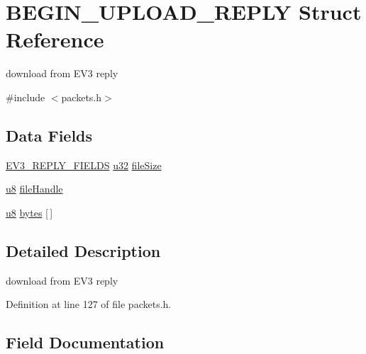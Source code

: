 \hypertarget{struct_b_e_g_i_n___u_p_l_o_a_d___r_e_p_l_y}{}\section{B\+E\+G\+I\+N\+\_\+\+U\+P\+L\+O\+A\+D\+\_\+\+R\+E\+P\+L\+Y Struct Reference}
\label{struct_b_e_g_i_n___u_p_l_o_a_d___r_e_p_l_y}


download from E\+V3 reply  




{\ttfamily \#include $<$packets.\+h$>$}

\subsection*{Data Fields}
\begin{DoxyCompactItemize}
\item 
\hyperlink{packets_8h_a382c165d520d462ac8f0c88e2a1970cb}{E\+V3\+\_\+\+R\+E\+P\+L\+Y\+\_\+\+F\+I\+E\+L\+D\+S} \hyperlink{defs_8h_afaa62991928fb9fb18ff0db62a040aba}{u32} \hyperlink{struct_b_e_g_i_n___u_p_l_o_a_d___r_e_p_l_y_afa8cac994ec0579d07285b61ffc8e0c7}{file\+Size}
\item 
\hyperlink{defs_8h_a92c50087ca0e64fa93fc59402c55f8ca}{u8} \hyperlink{struct_b_e_g_i_n___u_p_l_o_a_d___r_e_p_l_y_a1db5fbf603ad47a12353736f89c95073}{file\+Handle}
\item 
\hyperlink{defs_8h_a92c50087ca0e64fa93fc59402c55f8ca}{u8} \hyperlink{struct_b_e_g_i_n___u_p_l_o_a_d___r_e_p_l_y_a1fdde1580342b6b1df0d8f5213c45107}{bytes} \mbox{[}$\,$\mbox{]}
\end{DoxyCompactItemize}


\subsection{Detailed Description}
download from E\+V3 reply 

Definition at line 127 of file packets.\+h.



\subsection{Field Documentation}
\hypertarget{struct_b_e_g_i_n___u_p_l_o_a_d___r_e_p_l_y_a1fdde1580342b6b1df0d8f5213c45107}{}
